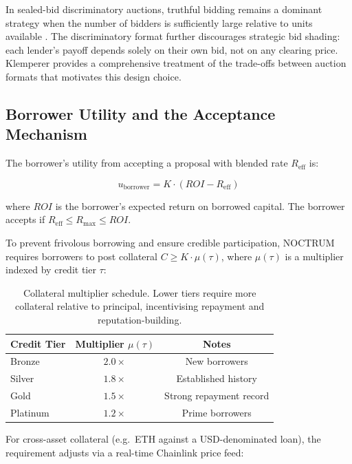\documentclass[a4paper,11pt]{article}
\begin{document}
In sealed-bid discriminatory auctions, truthful bidding remains a dominant
strategy when the number of bidders is sufficiently large relative to units
available \cite{monostori2014}. The discriminatory format further
discourages strategic bid shading: each lender's payoff depends solely on
their own bid, not on any clearing price. Klemperer \cite{klemperer2004}
provides a comprehensive treatment of the trade-offs between auction formats
that motivates this design choice.

\subsection{Borrower Utility and the Acceptance Mechanism}

The borrower's utility from accepting a proposal with blended rate
$R_{\text{eff}}$ is:

\begin{equation}
    u_{\text{borrower}} = K \cdot (ROI - R_{\text{eff}})
    \label{eq:borrowerutil}
\end{equation}

where $ROI$ is the borrower's expected return on borrowed capital. The
borrower accepts if $R_{\text{eff}} \leq R_{\max} \leq ROI$.

To prevent frivolous borrowing and ensure credible participation, NOCTRUM
requires borrowers to post collateral $C \geq K \cdot \mu(\tau)$, where
$\mu(\tau)$ is a multiplier indexed by credit tier $\tau$:

\begin{table}[H]
\centering
\caption{Collateral multiplier schedule. Lower tiers require more
  collateral relative to principal, incentivising repayment and
  reputation-building.}
\renewcommand{\arraystretch}{1.4}
\begin{tabular}{@{}lcc@{}}
  \toprule
  \textbf{Credit Tier} & \textbf{Multiplier $\mu(\tau)$} & \textbf{Notes} \\
  \midrule
  Bronze   & $2.0\times$ & New borrowers \\
  Silver   & $1.8\times$ & Established history \\
  Gold     & $1.5\times$ & Strong repayment record \\
  Platinum & $1.2\times$ & Prime borrowers \\
  \bottomrule
\end{tabular}
\label{tab:tiers}
\end{table}

For cross-asset collateral (e.g.\ ETH against a USD-denominated loan),
the requirement adjusts via a real-time Chainlink price feed:
\end{document}

